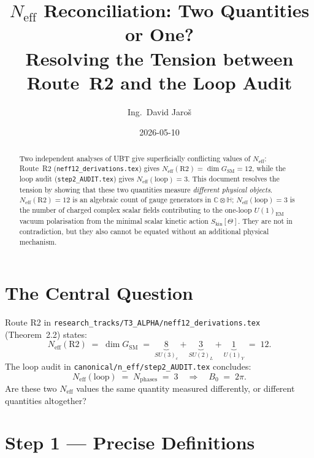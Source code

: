 \documentclass[12pt,a4paper]{article}
\title{$N_{\mathrm{eff}}$ Reconciliation: Two Quantities or One?\\
       \large Resolving the Tension between Route~R2 and the Loop Audit}
\author{Ing.\ David Jaro\v{s}}
\date{2026-05-10}
\theoremstyle{remark}
\newcommand{\Neff}{N_{\mathrm{eff}}}
\begin{document}
\maketitle

\begin{abstract}
Two independent analyses of UBT give superficially conflicting values of
$N_{\mathrm{eff}}$: Route~R2 (\texttt{neff12\_derivations.tex}) gives
$\Neff(\mathrm{R2})=\dim G_{\mathrm{SM}}=12$, while the loop audit
(\texttt{step2\_AUDIT.tex}) gives $\Neff(\mathrm{loop})=3$.
This document resolves the tension by showing that these two quantities
measure \emph{different physical objects}.
$\Neff(\mathrm{R2})=12$ is an algebraic count of gauge generators in
$\mathbb{C}\otimes\mathbb{H}$; $\Neff(\mathrm{loop})=3$ is the number
of charged complex scalar fields contributing to the one-loop
$U(1)_{\mathrm{EM}}$ vacuum polarisation from the minimal scalar kinetic
action $S_{\mathrm{kin}}[\Theta]$.  They are not in contradiction, but they
also cannot be equated without an additional physical mechanism.
\end{abstract}

\tableofcontents

\section{The Central Question}
\label{sec:question}

Route R2 in \texttt{research\_tracks/T3\_ALPHA/neff12\_derivations.tex}
(Theorem~2.2) states:
\begin{equation}
  \Neff(\mathrm{R2}) \;=\; \dim G_{\mathrm{SM}}
  \;=\; \underbrace{8}_{SU(3)_c}
       +\underbrace{3}_{SU(2)_L}
       +\underbrace{1}_{U(1)_Y}
  \;=\; 12.
  \label{eq:R2}
\end{equation}
The loop audit in \texttt{canonical/n\_eff/step2\_AUDIT.tex} concludes:
\begin{equation}
  \Neff(\mathrm{loop}) \;=\; N_{\mathrm{phases}} \;=\; 3
  \quad\Rightarrow\quad B_0 \;=\; 2\pi.
  \label{eq:audit}
\end{equation}
Are these two $\Neff$ values the same quantity measured differently,
or different quantities altogether?

\section{Step 1 — Precise Definitions}
\label{sec:definitions}
\end{document}
